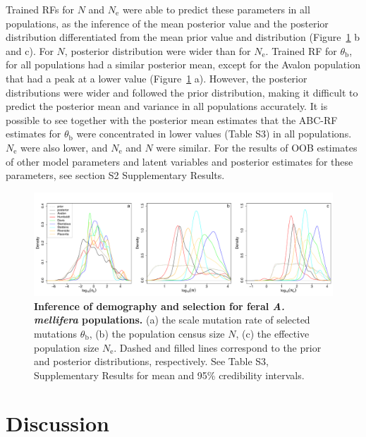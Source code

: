 \documentclass[a4paper, 12pt]{article}
\begin{document}
Trained RFs for $N$ and $N_{\mathrm{e}}$ were able to predict these parameters in all populations, as the inference of the mean posterior value and the posterior distribution differentiated from the mean prior value and distribution (Figure~\ref{fig:postBees_jointdemosel} b and c). For $N$, posterior distribution were wider than for $N_{\mathrm{e}}$. Trained RF for $\theta_{\mathrm{b}}$, for all populations had a similar posterior mean, except for the Avalon population that had a peak at a lower value (Figure~\ref{fig:postBees_jointdemosel} a). However, the posterior distributions were wider and followed the prior distribution, making it difficult to predict the posterior mean and variance in all populations accurately. It is possible to see together with the posterior mean estimates that the ABC-RF estimates for $\theta_{\mathrm{b}}$ were concentrated in lower values (Table S3) in all populations. $N_{\mathrm{e}}$ were also lower, and $N_{\mathrm{e}}$ and $N$ were similar. For the results of OOB estimates of other model parameters and latent variables and posterior estimates for these parameters, see section S2 Supplementary Results.


\begin{figure}[htb]
 \centering
 \includegraphics[width=1\textwidth]{Figures/Figure4_weighted_densityPlots_jointDemoSel_feralbees.pdf}
 \small\caption{\textbf{Inference of demography and selection for feral \textit{A. mellifera} populations.} (a) the scale mutation rate of selected mutations $\theta_{\mathrm{b}}$, (b) the population census size $N$, (c) the effective population size $N_{\mathrm{e}}$. Dashed and filled lines correspond to the prior and posterior distributions, respectively. See Table S3, Supplementary Results for mean and 95\% credibility intervals.}
 \label{fig:postBees_jointdemosel}
\end{figure}

\section*{Discussion}
\end{document}
